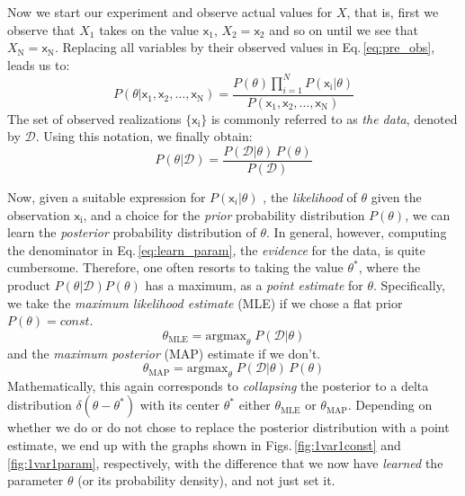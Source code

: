 \documentclass[]{report}
\begin{document}
Now we start our experiment and observe actual values for $X$, that is, first we observe that $X_1$ takes on the value $\mathsf{x}_1$, $X_2=\mathsf{x}_2$ and so on until we see that $X_\mathrm{N}=\mathsf{x}_\mathrm{N}$. Replacing all variables by their observed values in Eq.\,\ref{eq:pre_obs}, leads us to: 
\begin{equation} \label{eq:post_obs}
P(\theta | \mathsf{x}_1, \mathsf{x}_2,\ldots, \mathsf{x}_\mathrm{N}) = \frac{P(\theta)\prod_{i=1}^{N}P(\mathsf{x}_\mathrm{i}|\theta)}{P(\mathsf{x}_1, \mathsf{x}_2,\ldots, \mathsf{x}_\mathrm{N})}
\end{equation}
The set of observed realizations $\{\mathsf{x}_\mathrm{i}\}$ is commonly referred to as \emph{the data}, denoted by $\mathcal{D}$. Using this notation, we finally obtain:
\begin{equation} \label{eq:learn_param}
P(\theta | \mathcal{D}) = \frac{P(\mathcal{D}|\theta)\,P(\theta)}{P(\mathcal{D})}
\end{equation}

Now, given a suitable expression for $P(\mathsf{x}_i|\theta)$ , the \emph{likelihood} of $\theta$ given the observation $\mathsf{x}_\mathrm{i}$, and a choice for the \emph{prior} probability distribution $P(\theta)$, we can learn the \emph{posterior} probability distribution of $\theta$. In general, however, computing the denominator in Eq.\,\ref{eq:learn_param}, the \emph{evidence} for the data, is quite cumbersome. Therefore, one often resorts to taking the value $\theta^*$, where the product $P(\theta | \mathcal{D})P(\theta)$ has a maximum, as a \emph{point estimate} for $\theta$. Specifically, we take the \emph{maximum likelihood estimate} (MLE) if we chose a flat prior $P(\theta)=const.$
\begin{equation}
\theta_\mathrm{MLE} = \mathrm{argmax}_\theta\;P(\mathcal{D}|\theta)
\end{equation}
and the \emph{maximum posterior} (MAP) estimate if we don't.
\begin{equation}
\theta_\mathrm{MAP} = \mathrm{argmax}_\theta\;P(\mathcal{D}|\theta)\,P(\theta)
\end{equation}
Mathematically, this again corresponds to \emph{collapsing} the posterior to a delta distribution $\delta(\theta-\theta^*)$ with its center $\theta^*$ either $\theta_\mathrm{MLE}$ or $\theta_\mathrm{MAP}$. Depending on whether we do or do not chose to replace the posterior distribution with a point estimate, we end up with the graphs shown in Figs.\,\ref{fig:1var1const} and \ref{fig:1var1param}, respectively, with the difference that we now have \emph{learned} the parameter $\theta$ (or its probability density), and not just set it.
\end{document}
